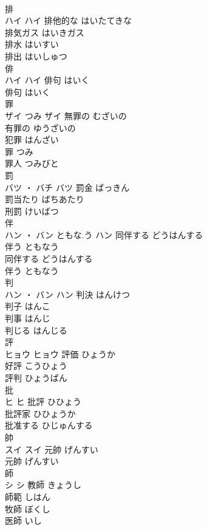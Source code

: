 \documentclass[8pt]{extreport}
\begin{document}
\begin{CJK}{UTF8}{min}
\\	排	
\\	ハイ		ハイ	排他的な	はいたてきな	
\\	排気ガス	はいきガス	
\\	排水	はいすい	
\\	排出	はいしゅつ	
\\	俳	
\\	ハイ		ハイ	俳句	はいく	
\\	俳句	はいく	
\\	罪	
\\	ザイ	つみ	ザイ	無罪の	むざいの	
\\	有罪の	ゆうざいの	
\\	犯罪	はんざい	
\\	罪	つみ	
\\	罪人	つみびと	
\\	罰	
\\	バツ ・ バチ		バツ	罰金	ばっきん	
\\	罰当たり	ばちあたり	
\\	刑罰	けいばつ	
\\	伴	
\\	ハン ・ バン	ともな.う	ハン	同伴する	どうはんする	
\\	伴う	ともなう	
\\	同伴する	どうはんする	
\\	伴う	ともなう	
\\	判	
\\	ハン ・ バン		ハン	判決	はんけつ	
\\	判子	はんこ	
\\	判事	はんじ	
\\	判じる	はんじる	
\\	評	
\\	ヒョウ		ヒョウ	評価	ひょうか	
\\	好評	こうひょう	
\\	評判	ひょうばん	
\\	批	
\\	ヒ		ヒ	批評	ひひょう	
\\	批評家	ひひょうか	
\\	批准する	ひじゅんする	
\\	帥	
\\	スイ		スイ	元帥	げんすい	
\\	元帥	げんすい	
\\	師	
\\	シ		シ	教師	きょうし	
\\	師範	しはん	
\\	牧師	ぼくし	
\\	医師	いし	

\end{CJK}
\end{document}
